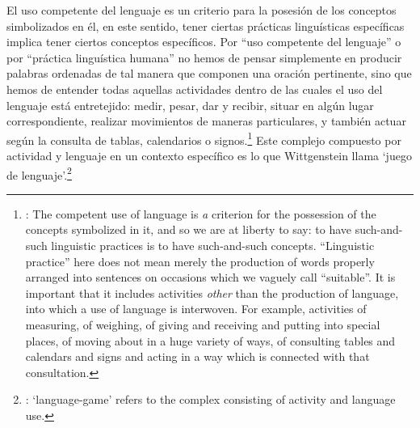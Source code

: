 El uso competente del lenguaje es un criterio para la posesión de los conceptos simbolizados en él, en este sentido, tener ciertas prácticas linguísticas específicas implica tener ciertos conceptos específicos. Por \enquote{uso competente del lenguaje} o por \enquote{práctica linguística humana} no hemos de pensar simplemente en producir palabras ordenadas de tal manera que componen una oración pertinente, sino que hemos de entender todas aquellas actividades dentro de las cuales el uso del lenguaje está entretejido: medir, pesar, dar y recibir, situar en algún lugar correspondiente, realizar movimientos de maneras particulares, y también actuar según la consulta de tablas, calendarios o signos.\footnote{\cite[Cf.~][117]{anscombe1981parmenides:qli}: The competent use of language is \emph{a} criterion for the possession of the concepts symbolized in it, and so we are at liberty to say: to have such-and-such linguistic practices is to have such-and-such concepts. ``Linguistic practice'' here does not mean merely the production of words properly arranged into sentences on occasions which we vaguely call ``suitable''. It is important that it includes activities \emph{other} than the production of language, into which a use of language is interwoven. For example, activities of measuring, of weighing, of giving and receiving and putting into special places, of moving about in a huge variety of ways, of consulting tables and calendars and signs and acting in a way which is connected with that consultation.} Este complejo compuesto por actividad y lenguaje en un contexto específico es lo que Wittgenstein llama `juego de lenguaje'.\footnote{\cite[Cf.~][62]{bakerhacker2009understanding}: `language-game' refers to the complex consisting of activity and language use.}

